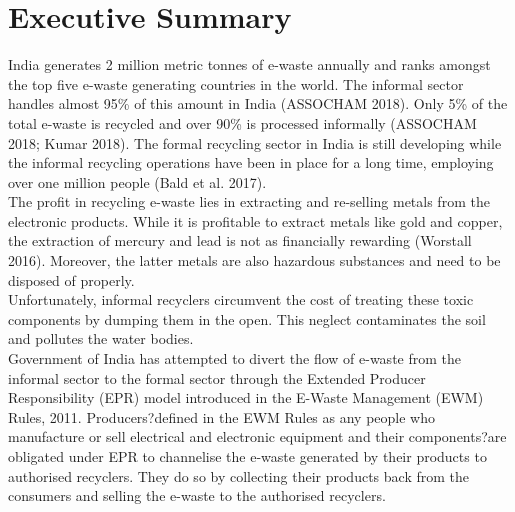 \documentclass[a4paper, 12pt]{article}
\begin{document}
                    \section*{Executive Summary}
                    India generates 2 million metric tonnes of e-waste annually and ranks amongst the top five e-waste generating countries in the world. The informal sector handles almost 95\% of this amount in India \parencite{shleifer1993corruption} (ASSOCHAM 2018). Only 5\% of the total e-waste is recycled and over 90\% is processed informally (ASSOCHAM 2018; Kumar 2018). The formal recycling sector in India is still developing while the informal recycling operations have been in place for a long time, employing over one million people (Bald et al. 2017).  \\
                    
                    The profit in recycling e-waste lies in extracting and re-selling metals from the electronic products. While it is profitable to extract metals like gold and copper, the extraction of mercury and lead is not as financially rewarding (Worstall 2016). Moreover, the latter metals are also hazardous substances and need to be disposed of properly. \\
                    
                    Unfortunately, informal recyclers circumvent the cost of treating these toxic components by dumping them in the open. This neglect contaminates the soil and pollutes the water bodies.\\
                    
                    Government of India has attempted to divert the flow of e-waste from the informal sector to the formal sector through the Extended Producer Responsibility (EPR) model introduced in the E-Waste Management (EWM) Rules, 2011. Producers?defined in the EWM Rules as any people who manufacture or sell electrical and electronic equipment and their components?are obligated under EPR to channelise the e-waste generated by their products to authorised recyclers. They do so by collecting their products back from the consumers and selling the e-waste to the authorised recyclers.  \\
                    
\end{document}
